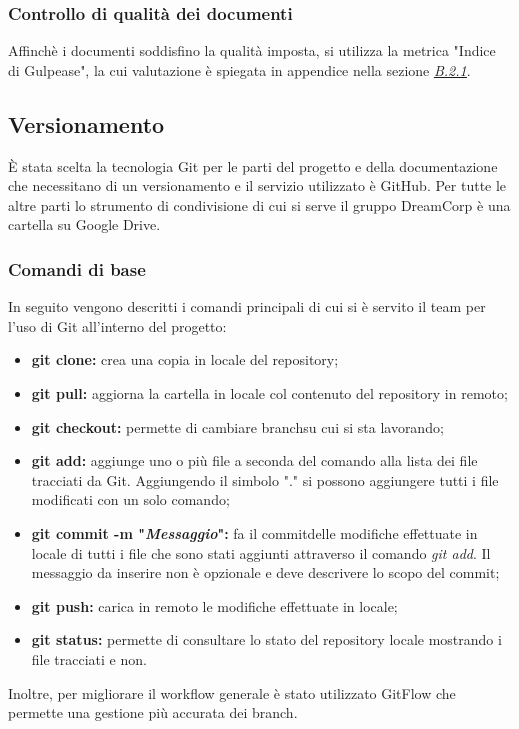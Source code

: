 \subsubsection{Controllo di qualità dei documenti}
Affinchè i documenti soddisfino la qualità imposta, si utilizza la metrica "Indice di Gulpease", la cui valutazione è spiegata in appendice nella sezione \hyperref[B.2.1]{\textit{\underline{B.2.1}}}.
	\subsection{Versionamento}
		È stata scelta la tecnologia Git per le parti del progetto e della documentazione che necessitano di un versionamento e il servizio utilizzato è GitHub. Per tutte le altre parti lo strumento di condivisione di cui si serve il gruppo DreamCorp è una cartella su Google Drive\pedice.
		\subsubsection{Comandi di base}
			In seguito vengono descritti i comandi principali di cui si è servito il team per l'uso di Git all'interno del progetto:
			\begin{itemize}
				\item \textbf{git clone:} crea una copia in locale del repository\pedice;
				\item \textbf{git pull:} aggiorna la cartella in locale col contenuto del repository in remoto;
				\item \textbf{git checkout:} permette di cambiare branch\pedice su cui si sta lavorando;
				\item \textbf{git add:} aggiunge uno o più file a seconda del comando alla lista dei file tracciati da Git. Aggiungendo il simbolo "." si possono aggiungere tutti i file modificati con un solo comando;
				\item \textbf{git commit -m "\textit{Messaggio}":} fa il commit\pedice delle modifiche effettuate in locale di tutti i file che sono stati aggiunti attraverso il comando \textit{git add}. Il messaggio da inserire non è opzionale e deve descrivere lo scopo del commit;
				\item \textbf{git push:} carica in remoto le modifiche effettuate in locale;
				\item \textbf{git status:} permette di consultare  lo stato del repository locale mostrando i file tracciati e non. \newline
			\end{itemize}
			Inoltre, per migliorare il workflow generale è stato utilizzato GitFlow che permette una gestione più accurata dei branch.
